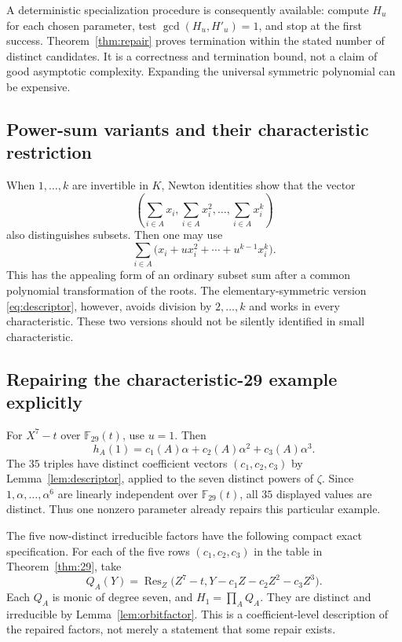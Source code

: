 \documentclass[11pt,a4paper]{article}
\theoremstyle{definition}
\theoremstyle{remark}
\newcommand{\F}{\mathbb F}
\newcommand{\Res}{\operatorname{Res}}
\begin{document}
A deterministic specialization procedure is consequently available:
compute $H_u$ for each chosen parameter, test
$\gcd(H_u,H'_u)=1$, and stop at the first success. Theorem~\ref{thm:repair}
proves termination within the stated number of distinct candidates. It is
a correctness and termination bound, not a claim of good asymptotic
complexity. Expanding the universal symmetric polynomial can be expensive.

\subsection{Power-sum variants and their characteristic restriction}

When $1,\ldots,k$ are invertible in $K$, Newton identities show that the
vector
\[
 \left(\sum_{i\in A}x_i,\sum_{i\in A}x_i^2,\ldots,
 \sum_{i\in A}x_i^k\right)
\]
also distinguishes subsets. Then one may use
\[
 \sum_{i\in A}\bigl(x_i+ux_i^2+\cdots+u^{k-1}x_i^k\bigr).
\]
This has the appealing form of an ordinary subset sum after a common
polynomial transformation of the roots. The elementary-symmetric version
\eqref{eq:descriptor}, however, avoids division by $2,\ldots,k$ and works
in every characteristic. These two versions should not be silently
identified in small characteristic.

\subsection{Repairing the characteristic-29 example explicitly}

For $X^7-t$ over $\F_{29}(t)$, use $u=1$. Then
\[
 h_A(1)=c_1(A)\alpha+c_2(A)\alpha^2+c_3(A)\alpha^3.
\]
The $35$ triples have distinct coefficient vectors
$(c_1,c_2,c_3)$ by Lemma~\ref{lem:descriptor}, applied to the seven distinct
powers of $\zeta$. Since $1,\alpha,\ldots,\alpha^6$ are linearly
independent over $\F_{29}(t)$, all $35$ displayed values are distinct.
Thus one nonzero parameter already repairs this particular example.

The five now-distinct irreducible factors have the following compact exact
specification. For each of the five rows $(c_1,c_2,c_3)$ in the table in
Theorem~\ref{thm:29}, take
\begin{equation}
 Q_A(Y)=\Res_Z\bigl(Z^7-t,
           Y-c_1Z-c_2Z^2-c_3Z^3\bigr).
 \label{eq:repairfactors}
\end{equation}
Each $Q_A$ is monic of degree seven, and
$H_1=\prod_A Q_A$. They are distinct and irreducible by
Lemma~\ref{lem:orbitfactor}. This is a coefficient-level description of
the repaired factors, not merely a statement that some repair exists.
\end{document}

